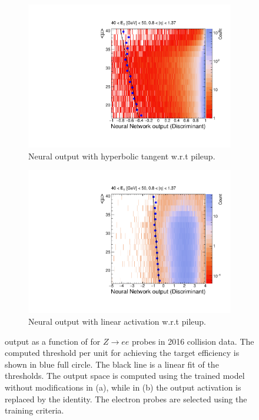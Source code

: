 \begin{figure}[h!tb]
  \begin{center}
  \begin{subfigure}[c]{.48\textwidth}
  \centering
  \includegraphics[width=\textwidth]{sections/ringer/figures/th2_signal_tight_cutbased_et3_eta1_with_tansig.pdf}
  \caption{Neural output with hyperbolic tangent w.r.t pileup.}
  \label{fig:nn_correction_with_tansig}
  \end{subfigure}
  \hfill
  \begin{subfigure}[c]{.48\textwidth}
  \centering
  \includegraphics[width=\textwidth]{sections/ringer/figures/th2_signal_tight_cutbased_et3_eta1_without_tansig.pdf}
  \caption{Neural output with linear activation w.r.t pileup.}
  \label{fig:nn_correction_without_tansig}
  \end{subfigure}
  \caption{
    \rnn output as a function of \avgmu{} for $Z\rightarrow ee$ probes in 
    2016 collision data.
    The computed threshold per \avgmu{} unit for achieving the target 
    efficiency is shown in blue full circle. The black line is a linear fit of the thresholds.
    The output space is computed using the trained model without modifications 
    in (a), while in (b) the output activation is replaced by the identity.
    The electron probes are selected using the training criteria.
  }%
  \end{center}
  \end{figure}
